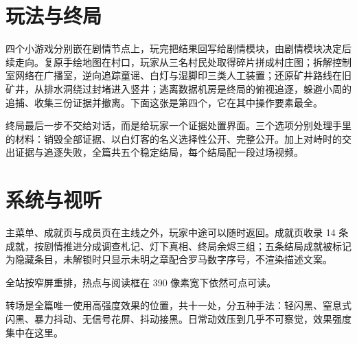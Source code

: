
\section{玩法与终局}

四个小游戏分别嵌在剧情节点上，玩完把结果回写给剧情模块，由剧情模块决定后续走向。复原手绘地图在村口，玩家从三名村民处取得碎片拼成村庄图；拆解控制室网络在广播室，逆向追踪童谣、白灯与湿脚印三类人工装置；还原矿井路线在旧矿井，从排水洞绕过封堵进入竖井；逃离数据机房是终局的俯视追逐，躲避小周的追捕、收集三份证据并撤离。下面这张是第四个，它在其中操作要素最全。


终局最后一步不交给对话，而是给玩家一个证据处置界面。三个选项分别处理手里的材料：销毁全部证据、以白灯客的名义选择性公开、完整公开。加上对峙时的交出证据与追逐失败，全篇共五个稳定结局，每个结局配一段过场视频。



\section{系统与视听}

主菜单、成就页与成员页在主线之外，玩家中途可以随时返回。成就页收录 14 条成就，按剧情推进分成调查札记、灯下真相、终局余烬三组；五条结局成就被标记为隐藏条目，未解锁时只显示未明之章配合罗马数字序号，不渲染描述文案。


全站按窄屏重排，热点与阅读框在 390 像素宽下依然可点可读。


转场是全篇唯一使用高强度效果的位置，共十一处，分五种手法：轻闪黑、窒息式闪黑、暴力抖动、无信号花屏、抖动接黑。日常动效压到几乎不可察觉，效果强度集中在这里。

